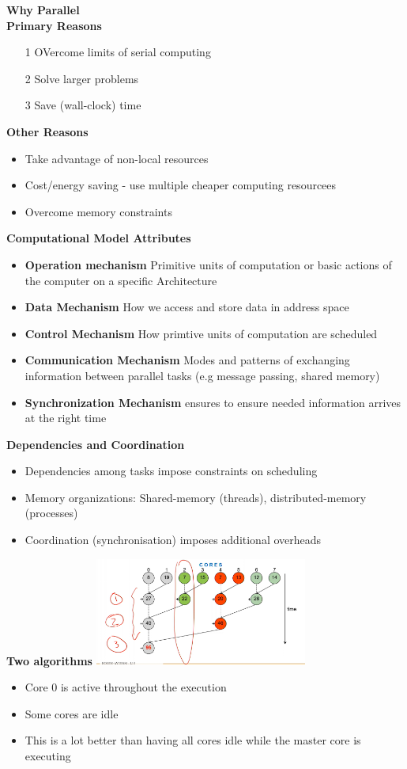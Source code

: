 \documentclass[10pt, landscape]{article}
\begin{document}
\begin{multicols}{4}
\textbf{Why Parallel} \\
\textbf{Primary Reasons}
\begin{itemize}
    \item [1] OVercome limits of serial computing
    \item [2] Solve larger problems
    \item [3] Save (wall-clock) time
\end{itemize}
\textbf{Other Reasons}
\begin{itemize}
    \item Take advantage of non-local resources 
    \item Cost/energy saving - use multiple cheaper computing resourcees 
    \item Overcome memory constraints
\end{itemize}

\textbf{Computational Model Attributes} \\
\begin{itemize}
    \item \textbf{Operation mechanism} Primitive units of computation or basic actions of the computer on a specific Architecture 
    \item \textbf{Data Mechanism} How we access and store data in address space 
    \item \textbf{Control Mechanism} How primtive units of computation are scheduled
    \item \textbf{Communication Mechanism} Modes and patterns of exchanging information between parallel tasks (e.g message passing, shared memory)
    \item \textbf{Synchronization Mechanism} ensures to ensure needed information arrives at the right time
\end{itemize}

\textbf{Dependencies and Coordination}
\begin{itemize}
    \item Dependencies among tasks impose constraints on scheduling 
    \item Memory organizations: Shared-memory (threads), distributed-memory (processes) 
    \item Coordination (synchronisation) imposes additional overheads
\end{itemize}

\textbf{Two algorithms}
\includegraphics*[width=7cm]{l1_1.png}
\begin{itemize}
    \item Core 0 is active throughout the execution
    \item Some cores are idle
    \item This is a lot better than having all cores idle while the master core is executing
\end{itemize}



\end{multicols}
\end{document}
